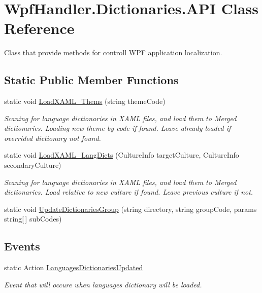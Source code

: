 \hypertarget{class_wpf_handler_1_1_dictionaries_1_1_a_p_i}{}\section{Wpf\+Handler.\+Dictionaries.\+A\+PI Class Reference}
\label{class_wpf_handler_1_1_dictionaries_1_1_a_p_i}


Class that provide methods for controll W\+PF application localization.  


\subsection*{Static Public Member Functions}
\begin{DoxyCompactItemize}
\item 
static void \mbox{\hyperlink{class_wpf_handler_1_1_dictionaries_1_1_a_p_i_ac9aafbe351f06f0c20de39508d3e8852}{Load\+X\+A\+M\+L\+\_\+\+Thems}} (string theme\+Code)
\begin{DoxyCompactList}\small\item\em Scaning for language dictionaries in X\+A\+ML files, and load them to Merged dictionaries. Loading new theme by code if found. Leave already loaded if overrided dictionary not found. \end{DoxyCompactList}\item 
static void \mbox{\hyperlink{class_wpf_handler_1_1_dictionaries_1_1_a_p_i_ad5c415a6377e871aff2020a9489815ff}{Load\+X\+A\+M\+L\+\_\+\+Lang\+Dicts}} (Culture\+Info target\+Culture, Culture\+Info secondary\+Culture)
\begin{DoxyCompactList}\small\item\em Scaning for language dictionaries in X\+A\+ML files, and load them to Merged dictionaries. Load relative to new culture if found. Leave previous culture if not. \end{DoxyCompactList}\item 
static void \mbox{\hyperlink{class_wpf_handler_1_1_dictionaries_1_1_a_p_i_a0de06b29ec542383dbdc470bb9a7c98e}{Update\+Dictionaries\+Group}} (string directory, string group\+Code, params string\mbox{[}$\,$\mbox{]} sub\+Codes)
\end{DoxyCompactItemize}
\subsection*{Events}
\begin{DoxyCompactItemize}
\item 
static Action \mbox{\hyperlink{class_wpf_handler_1_1_dictionaries_1_1_a_p_i_a1d26084678af47b609f686215de5a171}{Languages\+Dictionaries\+Updated}}
\begin{DoxyCompactList}\small\item\em Event that will occure when languages dictionary will be loaded. \end{DoxyCompactList}\end{DoxyCompactItemize}


